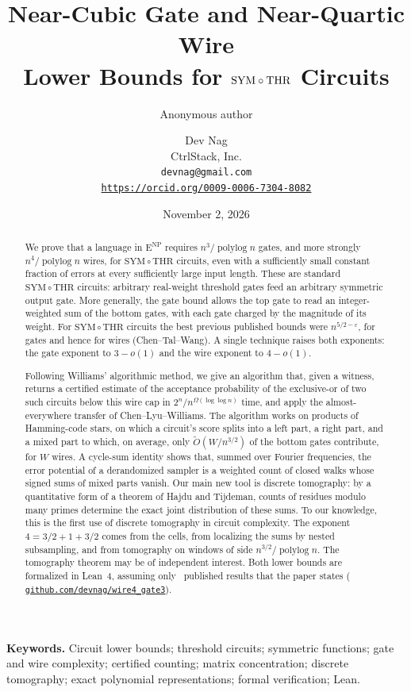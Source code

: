 \documentclass[11pt,letterpaper]{article}
\title{Near-Cubic Gate and Near-Quartic Wire\\
Lower Bounds for \texorpdfstring{$\SYM\circ\THR$}{SYM∘THR} Circuits}
\author{Anonymous author}
\author{Dev Nag\\
CtrlStack, Inc.\\
\texttt{devnag@gmail.com}\\
\href{https://orcid.org/0009-0006-7304-8082}{\nolinkurl{https://orcid.org/0009-0006-7304-8082}}}
\date{November 2, 2026}
\newcommand{\leanrepo}{%
  \href{https://github.com/devnag/wire4_gate3}{\nolinkurl{github.com/devnag/wire4_gate3}}}
\theoremstyle{definition}
\theoremstyle{remark}
\newcommand{\THR}{\mathrm{THR}}
\newcommand{\SYM}{\mathrm{SYM}}
\newcommand{\ENP}{\mathrm{E}^{\mathrm{NP}}}
\newcommand{\polylog}{\operatorname{polylog}}
\begin{document}
\maketitle
\begin{abstract}\fontsize{11}{13.2}\selectfont
We prove that a language in \(\ENP\) requires
\(n^3/\polylog n\) gates, and more strongly
\(n^4/\polylog n\) wires, for \(\SYM\circ\THR\) circuits,
even with a sufficiently small constant fraction of errors at every
sufficiently large input length. These are standard \(\SYM\circ\THR\) circuits: arbitrary real-weight
threshold gates feed an arbitrary symmetric output gate. More generally,
the gate bound allows the top gate to read an integer-weighted sum
of the bottom gates, with each gate charged by the magnitude of its
weight. For \(\SYM\circ\THR\) circuits the best previous published bounds were \(n^{5/2-\varepsilon}\), for gates and hence for wires (Chen--Tal--Wang). A single technique raises both exponents: the gate exponent to \(3-o(1)\) and the wire exponent to \(4-o(1)\).

Following Williams' algorithmic method, we give an algorithm that,
given a witness, returns a certified estimate of the acceptance
probability of the exclusive-or of two such circuits below this wire
cap in \(2^n/n^{\Omega(\log\log n)}\) time, and apply the
almost-everywhere transfer of Chen--Lyu--Williams.
The algorithm works on products of Hamming-code stars, on which a
circuit's score splits into a left part, a right part, and a mixed
part to which, on average, only \(\widetilde O(W/n^{3/2})\) of the
bottom gates contribute, for \(W\) wires. A cycle-sum identity shows
that, summed over Fourier frequencies, the error potential of a
derandomized sampler is a weighted count of closed walks whose signed
sums of mixed parts vanish.
Our main new tool is discrete tomography: by a quantitative form of a
theorem of Hajdu and Tijdeman, counts of residues modulo many primes
determine the exact joint distribution of these sums. To our knowledge,
this is the first use of discrete tomography in circuit complexity.
The exponent \(4=3/2+1+3/2\) comes from the cells, from localizing
the sums by nested subsampling, and from tomography on windows of side
\(n^{3/2}/\polylog n\). The tomography theorem may be of independent
interest.
Both lower bounds are formalized in Lean~4, assuming only
\publishedinputcount\ published results that the paper states (\leanrepo).
\end{abstract}

\medskip
\noindent\textbf{Keywords.} Circuit lower bounds; threshold
circuits; symmetric functions; gate and wire complexity; certified counting;
matrix concentration; discrete tomography; exact polynomial representations;
formal verification; Lean.
\end{document}
